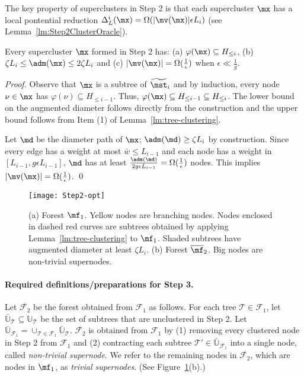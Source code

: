 The key property of superclusters in Step 2 is that each supercluster $\mx$ has a local pontential reduction $\Delta_{L}^i(\mx) = \Omega(|\mv(\mx)|\epsilon L_i)$ (see Lemma~\ref{lm:Step2ClusterOracle}).

\begin{lemma}\label{lm:Step2-Oracle-Diameter} 
	Every supercluster $\mx$ formed in Step 2 has: (a) $\varphi(\mx)\subseteq H_{\leq i}$, (b) $\zeta L_i \leq \adm(\mx)\leq 2\zeta L_i$  and (c) $|\mv(\mx)| = \Omega(\frac{1}{\epsilon})$ when $\epsilon \ll \frac{1}{g}$.
\end{lemma}
\begin{proof}
	 Observe that $\mx$ is a subtree of $\widetilde{\mst}_i$ and by induction, every node $\nu \in \mx$ has $\varphi(\nu) \subseteq H_{\leq i-1}$. Thus, $\varphi(\mx)\subseteq H_{\leq i-1}\subseteq H_{\leq i}$. The lower bound on the augmented diameter follows directly from the construction  and the upper bound follows from  Item (1) of Lemma~\ref{lm:tree-clustering}. 
	
		Let $\md$ be the diameter path of $\mx$; $\adm(\md)\geq \zeta L_i$ by construction. Since every edge has a weight at most $\bar{w} \leq L_{i-1}$ and each node has a weight in $[L_{i-1},g\epsilon L_{i-1}]$, $\md$ has at least $\frac{\adm(\md)}{2g\epsilon L_{i-1}} = \Omega(\frac{1}{\epsilon})$ nodes. This implies $|\mv(\mx)| = \Omega(\frac{1}{\epsilon})$. \qed
\end{proof}




\begin{figure}[hbt]
	\centering
	\texttt{[image: Step2-opt]}
	\caption{ \footnotesize{(a) Forest $\mf_1$. Yellow nodes are branching nodes. Nodes enclosed in dashed red curves are subtrees obtained by applying Lemma~\ref{lm:tree-clustering} to $\mf_1$. Shaded subtrees have augmented diameter at least $\zeta L_i$. (b) Forest $\overline{\mf}_2$. Big nodes are non-trivial supernodes. }}
	\label{fig:Step2-opt}
\end{figure}

\paragraph{Required definitions/preparations for Step 3.~} Let $\overline{\mathcal{F}_2}$ be the forest obtained from $\mathcal{F}_1$ as follows. For each tree $\mathcal{T} \in \mathcal{F}_1$, let $\bar{\mathbb{U}}_{\mathcal{T}}\subseteq \mathbb{U}_{\mathcal{T}}$ be the set of subtrees that are unclustered in Step 2. Let $\bar{\mathbb{U}}_{\mathcal{F}_1} = \cup_{\mathcal{T} \in \mathcal{F}_1}\bar{\mathbb{U}}_{\mathcal{T}}$. $\overline{\mathcal{F}_2}$ is obtained from $\mathcal{F}_1$ by (1) removing every clustered node in Step 2 from $\mathcal{F}_1$ and (2) contracting each subtree $\mathcal{T}' \in \bar{\mathbb{U}}_{\mathcal{F}_1}$ into a single node, called \emph{non-trivial supernode}.  We refer to the remaining nodes in $\overline{\mathcal{F}_2}$, which are nodes in $\mf_1$, as \emph{trivial supernodes}.  (See Figure~\ref{fig:Step2-opt}(b).)

